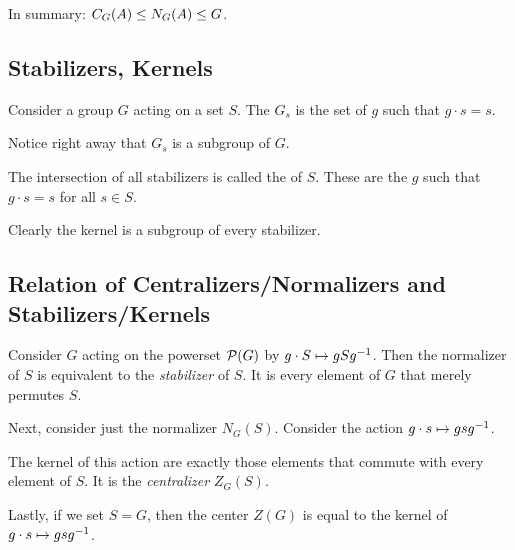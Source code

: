 \begin{remark}
  In summary: $C_G(A) \leq N_G(A) \leq G$.
\end{remark}

\subsection{Stabilizers, Kernels}

\begin{definition}
  Consider a group $G$ acting on a set $S$. The 
  $G_s$ is the set of $g$ such that $g \cdot s = s$.
\end{definition}

\begin{remark}
  Notice right away that $G_s$ is a subgroup of $G$.
\end{remark}

\begin{definition}
  The intersection of all stabilizers is called the  of
  $S$. These are the $g$ such that $g \cdot s = s$ for all $s \in S$.
\end{definition}

\begin{remark}
  Clearly the kernel is a subgroup of every stabilizer.
\end{remark}

\subsection{Relation of Centralizers/Normalizers and Stabilizers/Kernels}

\begin{remark}
  Consider $G$ acting on the powerset $\mathcal{P}\mathopen{}\left( {G} \right)\mathclose{}$ by $g \cdot S
  \mapsto gS{g}^{-1}$. Then the normalizer of $S$ is equivalent to the
  \emph{stabilizer} of $S$. It is every element of $G$ that merely
  permutes $S$.
\end{remark}

\begin{remark}
  Next, consider just the normalizer $N_G(S)$. Consider the action $g
  \cdot s \mapsto g s {g}^{-1}$.

  The kernel of this action are exactly those elements that commute with
  every element of $S$. It is the \emph{centralizer} $Z_G(S)$.
\end{remark}

\begin{remark}
  Lastly, if we set $S = G$, then the center $Z(G)$ is equal to the
  kernel of $g \cdot s \mapsto g s {g}^{-1}$.
\end{remark}
